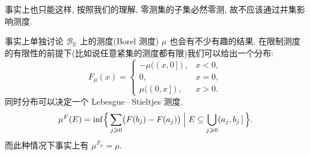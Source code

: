 \begin{alterendnote}
    事实上也只能这样, 按照我们的理解, 零测集的子集必然零测, 故不应该通过并集影响测度.
\end{alterendnote}
\begin{alterendnote}
    事实上单独讨论 $\mathcal B_{\mathbb R}$ 上的测度(Borel 测度) $\mu $ 也会有不少有趣的结果. 在限制测度的有限性的前提下(比如说任意紧集的测度都有限)我们可以给出一个分布:\[F_\mu(x) = \begin{cases}
            -\mu ((x,0\,]), & x<0, \\
            0,              & x=0, \\
            \mu ((0,x\,]),  & x>0.
        \end{cases}\]同时分布可以决定一个 Lebesgue\,--\,Stieltjes 测度.
    \[\mu^F (E)=\inf\Bigl\{ \,\sum_{j\geqslant 0}\bigl(F(b_j)-F(a_j)\bigr)\Bigm| E\subseteq\bigcup_{j\geqslant 0}(a_j,b_j\,]\, \Bigr\}.\]
    而此种情况下事实上有 $\mu ^{F_\mu}=\mu $.


\end{alterendnote}
